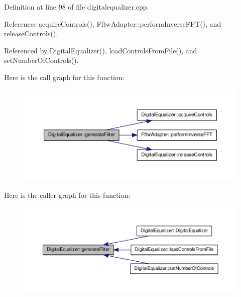 \-Definition at line 98 of file digitalequalizer.\-cpp.



\-References acquire\-Controls(), \-Fftw\-Adapter\-::perform\-Inverse\-F\-F\-T(), and release\-Controls().



\-Referenced by \-Digital\-Equalizer(), load\-Controls\-From\-File(), and set\-Number\-Of\-Controls().



\-Here is the call graph for this function\-:
\nopagebreak
\begin{figure}[H]
\begin{center}
\leavevmode
\includegraphics[width=350pt]{de/d28/classDigitalEqualizer_aa4a96390ed7480d85fbe4fac36239ec2_cgraph}
\end{center}
\end{figure}




\-Here is the caller graph for this function\-:
\nopagebreak
\begin{figure}[H]
\begin{center}
\leavevmode
\includegraphics[width=350pt]{de/d28/classDigitalEqualizer_aa4a96390ed7480d85fbe4fac36239ec2_icgraph}
\end{center}
\end{figure}


